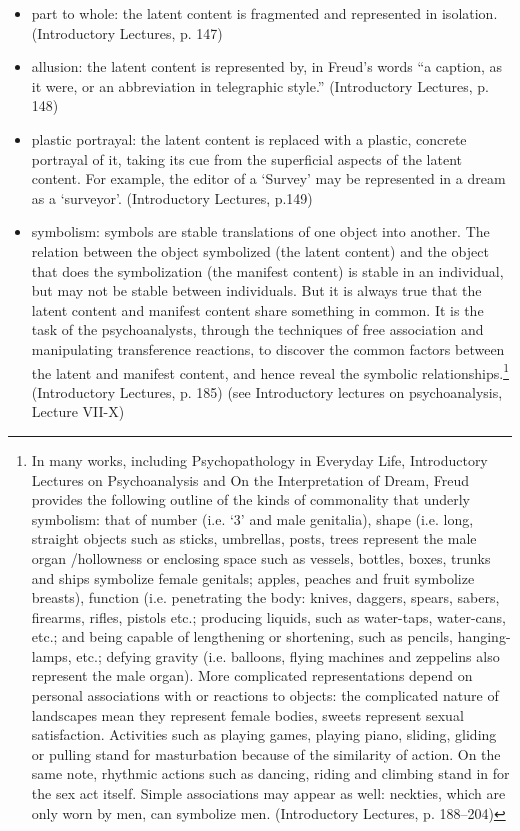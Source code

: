 \begin{itemize}
\item part to whole: the latent content is fragmented and represented in isolation. (Introductory Lectures, p. 147)

\item allusion: the latent content is represented by, in Freud's words “a caption, as it were, or an abbreviation in telegraphic style.” (Introductory Lectures, p. 148)

\item plastic portrayal: the latent content is replaced with a plastic, concrete portrayal of it, taking its cue from the superficial aspects of the latent content. For example, the editor of a `Survey' may be represented in a dream as a `surveyor'. (Introductory Lectures, p.149)

\item symbolism: symbols are stable translations of one object into another. The relation between the object symbolized (the latent content) and the object that does the symbolization (the manifest content) is stable in an individual, but may not be stable between individuals. But it is always true that the latent content and manifest content share something in common. It is the task of the psychoanalysts, through the techniques of free association and manipulating transference reactions, to discover the common factors between the latent and manifest content, and hence reveal the symbolic relationships.\footnote{In many works, including Psychopathology in Everyday Life, Introductory Lectures on Psychoanalysis and On the Interpretation of Dream, Freud provides the following outline of the kinds of commonality that underly symbolism: that of number (i.e. `3' and male genitalia), shape (i.e. long, straight objects such as sticks, umbrellas, posts, trees represent the male organ \slash  hollowness or enclosing space such as vessels, bottles, boxes, trunks and ships symbolize female genitals; apples, peaches and fruit symbolize breasts), function (i.e. penetrating the body: knives, daggers, spears, sabers, firearms, rifles, pistols etc.; producing liquids, such as water-taps, water-cans, etc.; and being capable of lengthening or shortening, such as pencils, hanging-lamps, etc.; defying gravity (i.e. balloons, flying machines and zeppelins also represent the male organ). More complicated representations depend on personal associations with or reactions to objects: the complicated nature of landscapes mean they represent female bodies, sweets represent sexual satisfaction. Activities such as playing games, playing piano, sliding, gliding or pulling stand for masturbation because of the similarity of action. On the same note, rhythmic actions such as dancing, riding and climbing stand in for the sex act itself. Simple associations may appear as well: neckties, which are only worn by men, can symbolize men. (Introductory Lectures, p. 188--204)} (Introductory Lectures, p. 185)
(see Introductory lectures on psychoanalysis, Lecture VII-X)

\end{itemize}

